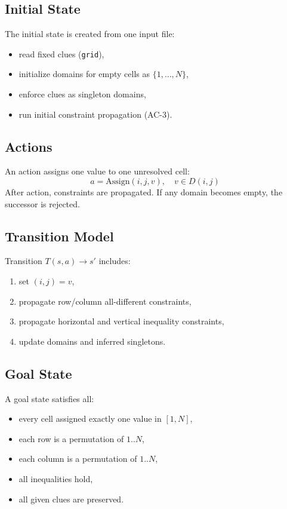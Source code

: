 \documentclass[12pt,a4paper]{article}
\begin{document}
\subsection{Initial State}
The initial state is created from one input file:
\begin{itemize}
    \item read fixed clues (\texttt{grid}),
    \item initialize domains for empty cells as $\{1,\dots,N\}$,
    \item enforce clues as singleton domains,
    \item run initial constraint propagation (AC-3).
\end{itemize}

\subsection{Actions}
An action assigns one value to one unresolved cell:
\[
a = \text{Assign}(i,j,v),\quad v\in D(i,j)
\]
After action, constraints are propagated. If any domain becomes empty, the successor is rejected.

\subsection{Transition Model}
Transition $T(s,a)\rightarrow s'$ includes:
\begin{enumerate}
    \item set $(i,j)=v$,
    \item propagate row/column all-different constraints,
    \item propagate horizontal and vertical inequality constraints,
    \item update domains and inferred singletons.
\end{enumerate}

\subsection{Goal State}
A goal state satisfies all:
\begin{itemize}
    \item every cell assigned exactly one value in $[1,N]$,
    \item each row is a permutation of $1..N$,
    \item each column is a permutation of $1..N$,
    \item all inequalities hold,
    \item all given clues are preserved.
\end{itemize}
\end{document}
